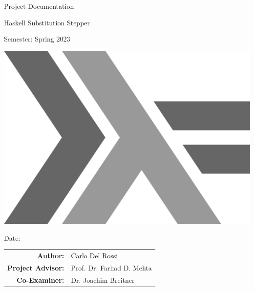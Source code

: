 \begin{titlepage}

    \begin{center}


        \vspace{1 cm}

        {\Large Project Documentation} \\

        \vspace{0.5cm}

        {\Huge Haskell Substitution Stepper}

        \vspace{0.5cm}

        Semester: Spring 2023

        \vspace{1 cm}

        \includegraphics[scale=0.1]{resources/haskell-logo.png}

        \vspace{1 cm}

        Date: \DTMnow \\
        \vspace{1 cm}

        \begin{tabular}{rl}
            \textbf{Author:}    & Carlo Del Rossi \\
            \textbf{Project Advisor:} & Prof. Dr. Farhad D. Mehta \\
            \textbf{Co-Examiner:}     & Dr. Joachim Breitner
        \end{tabular}


\end{center}
\end{titlepage}
